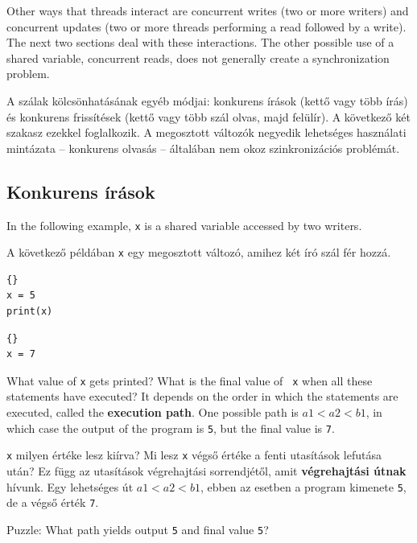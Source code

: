 \documentclass{book}
\begin{document}
Other ways that threads interact are
concurrent writes (two or more writers) and concurrent updates
(two or more threads performing a read followed by a write).
The next two sections deal with these interactions.  The other
possible use of a shared variable, concurrent
reads, does not generally create a synchronization problem.

A szálak kölcsönhatásának egyéb módjai: konkurens írások
(kettő vagy több írás) és konkurens frissítések (kettő vagy
több szál olvas, majd felülír). A következő két szakasz ezekkel
foglalkozik. A megosztott változók negyedik lehetséges használati
mintázata -- konkurens olvasás -- általában nem okoz szinkronizációs
problémát.
 
\subsection{Konkurens írások}

In the following example, {\tt x} is a shared variable accessed
by two writers.

A következő példában {\tt x} egy megosztott változó, amihez
két író szál fér hozzá.

\begin{minipage}[t]{2in}
\begin{lstlisting}[title={„A” szál}]{}
x = 5
print(x)
\end{lstlisting}
\end{minipage}
\hfill
\begin{minipage}[t]{2in}
\begin{lstlisting}[title={„B” szál}]{}
x = 7
\end{lstlisting}
\end{minipage}

What value of {\tt x} gets printed?  What is the final value of {\tt
x} when all these statements have executed?  It depends on the order
in which the statements are executed, called the {\bf execution path}.
One possible path is $a1 < a2 < b1$, in which case the output of the
program is {\tt 5}, but the final value is {\tt 7}.

{\tt x} milyen értéke lesz kiírva? Mi lesz {\tt x} végső értéke
a fenti utasítások lefutása után? Ez függ az utasítások végrehajtási
sorrendjétől, amit {\bf végrehajtási útnak} hívunk. Egy lehetséges
út $a1 < a2 < b1$, ebben az esetben a program kimenete {\tt 5}, de
a végső érték {\tt 7}.

Puzzle: What path yields output {\tt 5} and final
value {\tt 5}?
\end{document}
